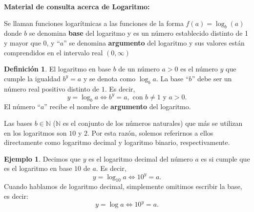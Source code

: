 \documentclass[12pt]{examdesign}
\theoremstyle{plain}
\theoremstyle{definition}
\newtheorem{exa}[theorem]{Ejemplo}
\newtheorem{defi}[theorem]{Definición}
\theoremstyle{remark}
\begin{document}
    \begin{endmatter}
    	\vspace{.2cm}
    	\centerline{\huge \textcolor{upforestgreen}{\textbf{Material de consulta acerca de Logaritmo:}}}
    	\vspace{.2cm}
    	Se llaman funciones logarítmicas a las funciones de la forma $f(a)=\log_{b}(a)$ donde $b$ se denomina \textbf{base} del logaritmo y es un número establecido distinto de 1 y mayor que 0, y ``$a$'' se denomina \textbf{argumento} del logaritmo y sus valores están comprendidos en el intervalo real $(0,\infty)$
    	\vspace{.2cm}
    	\begin{tcolorbox}[colback=red!10!white, colframe=tealgreen, title=\textbf{Logaritmo}]
    		\begin{defi}
    			El logaritmo en base $b$ de un número $a>0$ es el número $y$ que cumple la igualdad $b^{y} = a$ y se denota como $\log_{b} a$. La base ``$b$'' debe ser un número real positivo distinto de $1$. Es decir,
    			\begin{equation}
    			     y=\log_{b}a \Longleftrightarrow b^{y} = a,\mbox{ con } b\not=1 \mbox{ y } a>0.
    			\end{equation}
    		     El número ``$a$'' recibe el nombre de \textbf{argumento} del logaritmo.
    		\end{defi}
    	\end{tcolorbox}
    	\vspace{.2cm}
    	Las bases $b\in \mathbb{N}$ ($\mathbb{N}$ es el conjunto de los números naturales) que más se utilizan en los logaritmos son $10$ y $2$. Por esta razón, solemos referirnos a ellos directamente como logaritmo decimal y logaritmo binario, respectivamente.
    	\vspace{.2cm}
    	\begin{tcolorbox}[opteqC]
    		\begin{exa}
    			Decimos que $y$ es el logaritmo decimal del número $a$ es si cumple que es el logaritmo en base $10$ de $a$. Es decir,
    			\begin{equation}
    			    y=\log_{10}a \Longleftrightarrow 10^{y} = a.
    			\end{equation}
    			Cuando hablamos de logaritmo decimal, simplemente omitimos escribir la base, es decir:
    			\begin{equation}
    			    y=\log a \Longleftrightarrow 10^{y} = a.
    			\end{equation}

\end{exa}
\end{tcolorbox}
\end{endmatter}
\end{document}
